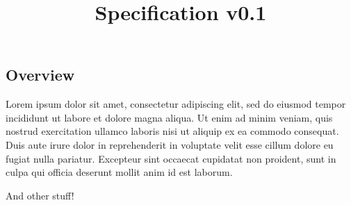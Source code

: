 \documentclass{myfuntestdoc}
\title{Specification v0.1}
\begin{document}
\frontmatter

\begin{titlepage}

  \section*{Overview}
  Lorem ipsum dolor sit amet, consectetur adipiscing elit, sed do
  eiusmod tempor incididunt ut labore et dolore magna aliqua. Ut enim
  ad minim veniam, quis nostrud exercitation ullamco laboris nisi ut
  aliquip ex ea commodo consequat. Duis aute irure dolor in
  reprehenderit in voluptate velit esse cillum dolore eu fugiat nulla
  pariatur. Excepteur sint occaecat cupidatat non proident, sunt in
  culpa qui officia deserunt mollit anim id est laborum.

  And other stuff!
\end{titlepage}

\tableofcontents
\listoftables
\listoffigures

\mainmatter



\end{document}

